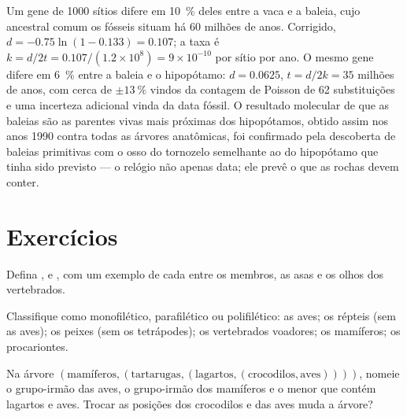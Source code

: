 \begin{example}\label{ex:b2:phylogenetic-trees:dating}
Um gene de \num{1000} sítios difere em \qty{10}{\%} deles entre a vaca e
a baleia, cujo ancestral comum os fósseis situam há 60 milhões de anos.
Corrigido, $d = -0.75\ln(1 - 0.133) = 0.107$; a taxa é $k
= d/2t = 0.107/(1.2\times 10^{8}) = 9\times 10^{-10}$ por sítio por
ano. O mesmo gene difere em \qty{6}{\%} entre a baleia e o hipopótamo:
$d = 0.0625$, $t = d/2k = 35$ milhões de anos, com cerca de $\pm
\qty{13}{\%}$ vindos da contagem de Poisson de 62 substituições e uma
incerteza adicional vinda da data fóssil. O resultado molecular de que
as baleias são as parentes vivas mais próximas dos hipopótamos, obtido
assim nos anos 1990 contra todas as árvores anatômicas, foi confirmado
pela descoberta de baleias primitivas com o osso do tornozelo semelhante
ao do hipopótamo que tinha sido previsto --- o relógio não apenas data;
ele prevê o que as rochas devem conter.
\end{example}

\section{Exercícios}

\begin{exercise}[$\star$]\label{exo:b2:phylogenetic-trees:1}
Defina ,  e , com um exemplo de cada entre
os membros, as asas e os olhos dos vertebrados.
\end{exercise}

\begin{exercise}[$\star$]\label{exo:b2:phylogenetic-trees:2}
Classifique como monofilético, parafilético ou polifilético: as aves;
os répteis (sem as aves); os peixes (sem os tetrápodes); os vertebrados
voadores; os mamíferos; os procariontes.
\end{exercise}

\begin{exercise}[$\star$]\label{exo:b2:phylogenetic-trees:3}
Na árvore $(\text{mamíferos},(\text{tartarugas},(\text{lagartos},
(\text{crocodilos},\text{aves}))))$, nomeie o grupo-irmão das
aves, o grupo-irmão dos mamíferos e o menor  que contém
lagartos e aves. Trocar as posições dos crocodilos e das aves muda a
árvore?
\end{exercise}


